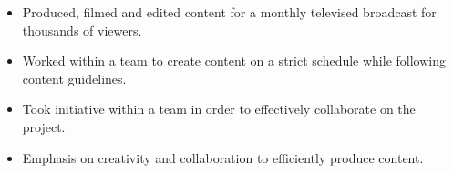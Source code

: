 \documentclass[10pt,a4paper]{altacv}
\begin{document}
\divider


\begin{itemize}
\item Produced, filmed and edited content for a monthly televised broadcast for thousands of viewers.
\item Worked within a team to create content on a strict schedule while following content guidelines.
\item Took initiative within a team in order to effectively collaborate on the project.
\item Emphasis on creativity and collaboration to efficiently produce content. 
\end{itemize}


\end{document}

